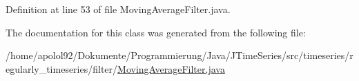 Definition at line 53 of file Moving\+Average\+Filter.\+java.



The documentation for this class was generated from the following file\+:\begin{DoxyCompactItemize}
\item 
/home/apolol92/\+Dokumente/\+Programmierung/\+Java/\+J\+Time\+Series/src/timeseries/regularly\+\_\+timeseries/filter/\hyperlink{_moving_average_filter_8java}{Moving\+Average\+Filter.\+java}\end{DoxyCompactItemize}
